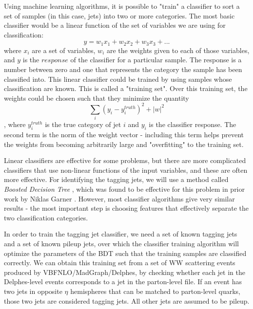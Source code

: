 \documentclass[10pt]{ucscthesisbs}
\begin{document}
Using machine learning algorithms, it is possible to "train" a classifier to sort a set of samples (in this case, jets) into two or more categories. The most basic classifier would be a linear function of the set of variables we are using for classification:
\begin{equation}
y = w_1x_1 + w_2x_2 + w_3x_3 + ...
\end{equation}
where ${x_i}$ are a set of variables, ${w_i}$ are the weights given to each of those variables, and $y$ is the $response$ of the classifier for a particular sample. The response is a number between zero and one that represents the category the sample has been classified into. This linear classifier could be trained by using samples whose classification are known. This is called a "training set". Over this training set, the weights could be chosen such that they minimize the quantity
\begin{equation}
\sum_i(y_i - y_i^{truth})^2 + |w|^2
\end{equation}
, where $y_i^{truth}$ is the true category of jet $i$ and $y_i$ is the classifier response. The second term is the norm of the weight vector - including this term helps prevent the weights from becoming arbitrarily large and "overfitting" to the training set. \par
Linear classifiers are effective for some problems, but there are more complicated classifiers that use non-linear functions of the input variables, and these are often more effective. For identifying the tagging jets, we will use a method called \textit{Boosted Decision Tree} \cite{BDT}, which was found to be effective for this problem in prior work by Niklas Garner \cite{nik}. However, most classifier algorithms give very similar results - the most important step is choosing features that effectively separate the two classification categories. \par
In order to train the tagging jet classifier, we need a set of known tagging jets and a set of known pileup jets, over which the classifier training algorithm will optimize the parameters of the BDT such that the training samples are classified correctly. We can obtain this training set from a set of WW scattering events produced by VBFNLO/MadGraph/Delphes, by checking whether each jet in the Delphes-level events corresponds to a jet in the parton-level file. If an event has two jets in opposite $\eta$ hemispheres that can be matched to parton-level quarks, those two jets are considered tagging jets. All other jets are assumed to be pileup. \par
\end{document}
